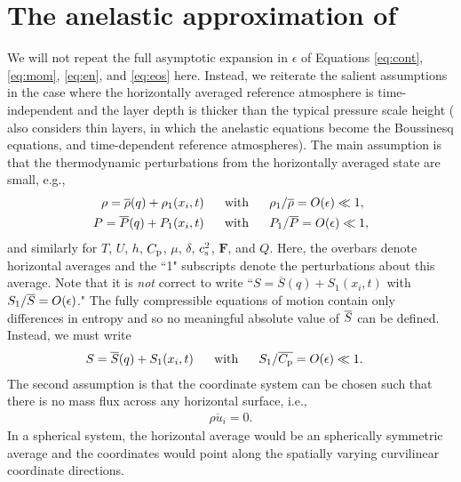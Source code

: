 \documentclass[12pt]{article}
\newcommand{\vecf}{\bm{F}}
\newcommand{\cpref}{\overline{\cpcap}}
\begin{document}
	\section{The anelastic approximation of \citet{Gough1969}}
	We will not repeat the full asymptotic expansion in $\epsilon$ of Equations \eqref{eq:cont}, \eqref{eq:mom}, \eqref{eq:en}, and \eqref{eq:eos} here. Instead, we reiterate the salient assumptions in the case where the horizontally averaged reference atmosphere is time-independent and the layer depth is thicker than the typical pressure scale height (\citet{Gough1969} also considers thin layers, in which the anelastic equations become the Boussinesq equations, and time-dependent reference atmospheres). The main assumption is that the thermodynamic perturbations from the horizontally averaged state are small, e.g.,
	\begin{align}\label{eq:linearthermo}
		\rho = \overline{\rho}(q) + \rho_1(x_i,t)\ \ \ \ \  &\text{with}\ \ \ \ \  \rho_1/\overline{\rho}=O(\epsilon)\ll 1,\\
		P = \overline{P}(q) + P_1(x_i,t)\ \ \ \ \  &\text{with}\ \ \ \ \  P_1/\overline{P}=O(\epsilon)\ll1 \nonumber,
	\end{align} 
	and similarly for $T$, $U$, $h$, $C_{\rm{p}}$, $\mu$, $\delta$, $c_{\rm s}^2$, $\vecf$, and $Q$. Here, the overbars denote horizontal averages and the ``1" subscripts denote the perturbations about this average. Note that it is \textit{not} correct to write ``$S=\overline{S}(q)+S_1(x_i,t)$ with $S_1/\overline{S}=O(\epsilon)$." The fully compressible equations of motion contain only differences in entropy and so no meaningful absolute value of $\overline{S}$ can be defined. Instead, we must write
	\begin{align}\label{eq:linearent}
	S = \sref(q) + S_1(x_i,t) \five &\with S_1/\cpref=O(\epsilon)\ll 1.
	\end{align} 
	The second assumption is that the coordinate system can be chosen such that there is no mass flux across any horizontal surface, i.e.,
	\begin{align}\label{eq:nomassflux}
		\overline{\rho u_i}=0.
	\end{align}
	In a spherical system, the horizontal average would be an spherically symmetric average and the coordinates would point along the spatially varying curvilinear coordinate directions. 
	
\end{document}
